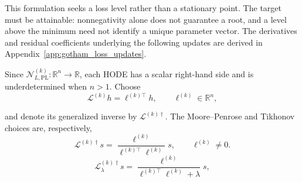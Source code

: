 \documentclass[11pt]{article}
\theoremstyle{remark}
\begin{document}
This formulation seeks a loss level rather than a stationary point.
The target must be attainable: nonnegativity alone does not guarantee
a root, and a level above the minimum need not identify a unique
parameter vector. The derivatives and residual coefficients underlying
the following updates are derived in Appendix~\ref{app:gotham_loss_updates}.

Since $\mathcal N_{L,\mathrm{PL}}^{(k)}:\mathbb R^n\to\mathbb R$,
each HODE has a scalar right-hand side and is underdetermined when
$n>1$. Choose
\begin{equation}
\label{eq:loss_root_aux_operator}
    \mathcal{L}^{(k)}h
    =
    \ell^{(k)\top}h,
    \qquad
    \ell^{(k)}\in\mathbb{R}^{n},
\end{equation}

and denote its generalized inverse by $\mathcal L^{(k)\dagger}$.
The Moore--Penrose and Tikhonov choices are, respectively,
\begin{equation}
\label{eq:loss_root_pinv}
    \mathcal{L}^{(k)\dagger}s
    =
    \frac{\ell^{(k)}}{\ell^{(k)\top}\ell^{(k)}}s,
    \qquad
    \ell^{(k)}\neq 0.
\end{equation}
\begin{equation}
\label{eq:loss_root_tikhonov}
    \mathcal{L}^{(k)\dagger}_{\lambda}s
    =
    \frac{\ell^{(k)}}{\ell^{(k)\top}\ell^{(k)}+\lambda}s,    
\end{equation}
\end{document}
